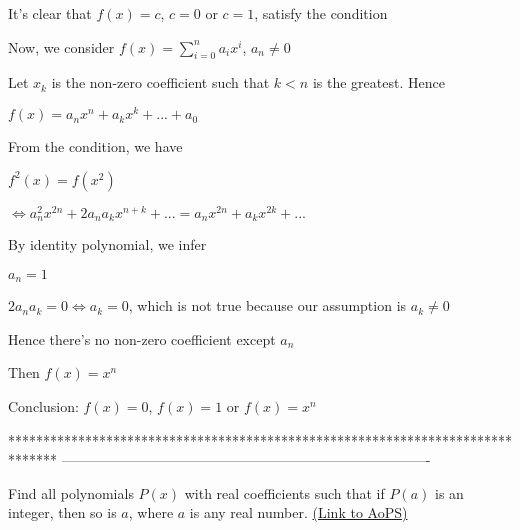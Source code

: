 \begin{solution}
	It's clear that $f(x)=c$, $c=0$ or $c=1$, satisfy the condition

Now, we consider $f\left( x \right) = \sum\limits_{i = 0}^n {{a_i}{x^i}} $, ${a_n} \ne 0$

Let $x_k$ is the non-zero coefficient such that $k<n$ is the greatest. Hence

$f\left( x \right) = {a_n}{x^n} + {a_k}{x^k} + ... + {a_0}$

From the condition, we have

${f^2}\left( x \right) = f\left( {{x^2}} \right)$

$ \Leftrightarrow a_n^2{x^{2n}} + 2{a_n}{a_k}{x^{n + k}} + ... = {a_n}{x^{2n}} + {a_k}{x^{2k}} + ...$

By identity polynomial, we infer

$a_n=1$

$2{a_n}{a_k}=0 \Leftrightarrow {a_k} = 0$, which is not true because our assumption is ${a_k} \ne 0$

Hence there's no non-zero coefficient except $a_n$

Then $f(x)=x^n$

Conclusion: $f(x)=0$, $f(x)=1$ or $f(x)=x^n$
\end{solution}
*******************************************************************************
-------------------------------------------------------------------------------

\begin{problem}
	Find all polynomials $P(x)$ with real coefficients such that if $P(a)$ is an integer, then so is $a$, where $a$ is any real number.
	\flushright \href{https://artofproblemsolving.com/community/c6h392444}{(Link to AoPS)}
\end{problem}



